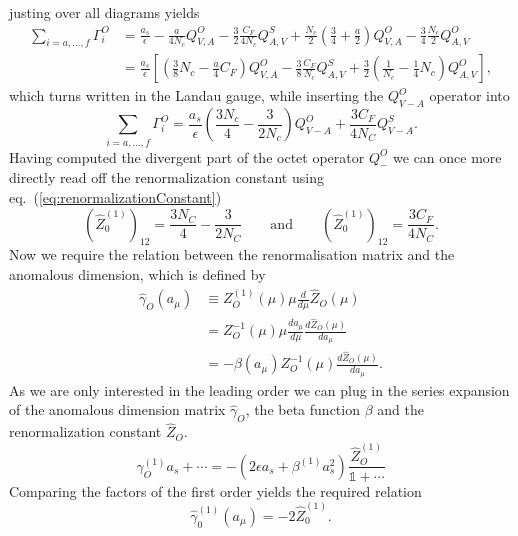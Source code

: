 	justing over all diagrams yields 
	\begin{equation}
		\begin{split}
			\label{eq:Q_-Octet}
			\sum_{i=a,\ldots,f}\Gamma^O_i &= \frac{a_s}{\epsilon} -\frac{a}{4N_c} Q^{O}_{V,A} - \frac{3}{2}\frac{C_F}{4N_c}Q^S_{A,V} + \frac{N_c}{2} \left(\frac{3}{4}+\frac{a}{2}\right) Q^O_{V,A} -\frac{3}{4}\frac{N_c}{2}Q^O_{A,V} \\
			&= \frac{a_s}{\epsilon} \left[\left(\frac{3}{8} N_c - \frac{a}{4} C_F \right) Q^O_{V,A} - \frac{3}{8}\frac{C_F}{N_c}Q^S_{A,V} + \frac{3}{2} \left( \frac{1}{N_c} - \frac{1}{4} N_c \right) Q^O_{A,V} \right],
		\end{split}
	\end{equation}
	which turns written in the Landau gauge, while inserting the $Q^O_{V-A}$ operator into
	\begin{equation}
		\sum_{i=a,\ldots,f}\Gamma^O_i = \frac{a_s}{\epsilon} \left(\frac{3N_c}{4}-\frac{3}{2N_c}\right) Q^O_{V-A} + \frac{3 C_F}{4 N_C} Q^S_{V-A}.
	\end{equation}
	Having computed the divergent part of the octet operator $Q^O_-$ we can once more directly read off the renormalization constant using eq.~(\ref{eq:renormalizationConstant})
	\begin{equation}
		(\hat Z^{(1)}_0)_{12} = \frac{3N_C}{4} - \frac{3}{2N_C} \qquad \text{and} \qquad  (\hat Z^{(1)}_0)_{12} = \frac{3C_F}{4N_C}.
	\end{equation}	
	Now we require the relation between the renormalisation matrix and the anomalous dimension, which is defined by
	\begin{equation}
		\begin{split}
			\hat \gamma_O (a_\mu) &\equiv Z^{(1)}_O(\mu) \mu \frac{d}{d\mu} \hat Z_O (\mu) \\	
			&= Z^{-1}_O(\mu) \mu \frac{d a_\mu}{d\mu} \frac{d \hat Z_O(\mu)}{da_\mu} \\
			&= - \beta(a_\mu) Z^{-1}_O(\mu) \frac{d \hat Z_O(\mu)}{da_\mu}.	
		\end{split}
	\end{equation}
	As we are only interested in the leading order we can plug in the series expansion of the anomalous dimension matrix $\hat \gamma_O$, the beta function $\beta$  and the renormalization constant $\hat Z_O$.
	\begin{equation}
		\gamma^{(1)}_O a_s + \cdots = - (2\epsilon a_s + \beta^{(1)}a^2_s) \frac{\hat Z^{(1)}_O}{\mathbb{1} + \cdots}
	\end{equation}	
	Comparing the factors of the first order yields the required relation
	\begin{equation}
		\hat \gamma^{(1)}_0(a_\mu) = - 2\hat Z^{(1)}_0.
	\end{equation}
	
